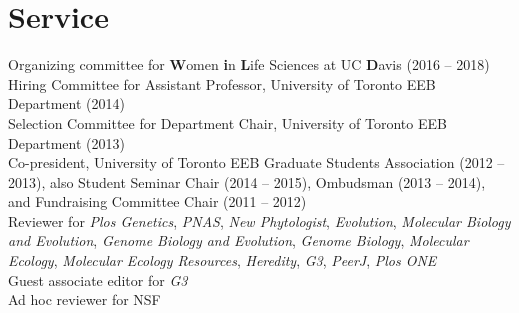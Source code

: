\documentclass[letterpaper]{article}
\begin{document}
\section*{Service}
Organizing committee for \textbf{W}omen \textbf{i}n \textbf{L}ife Sciences at UC \textbf{D}avis (2016 -- 2018) \\ [.5ex]
Hiring Committee for Assistant Professor, University of Toronto EEB Department (2014) \\ [.5ex]
Selection Committee for Department Chair, University of Toronto EEB Department (2013) \\ [.5ex]
Co-president, University of Toronto EEB Graduate Students Association (2012 -- 2013), also Student Seminar Chair (2014 -- 2015), Ombudsman (2013 -- 2014), and Fundraising Committee Chair (2011 -- 2012)\\ [.5ex]
Reviewer for \textit{Plos Genetics}, \textit{PNAS}, \textit{New Phytologist}, \textit{Evolution}, \textit{Molecular Biology and Evolution}, \textit{Genome Biology and Evolution}, \textit{Genome Biology}, \textit{Molecular Ecology}, \textit{Molecular Ecology Resources}, \textit{Heredity}, \textit{G3}, \textit{PeerJ}, \textit{Plos ONE}\\  [.5ex]
Guest associate editor for \textit{G3}\\  [.5ex]
Ad hoc reviewer for NSF
%
\end{document}
